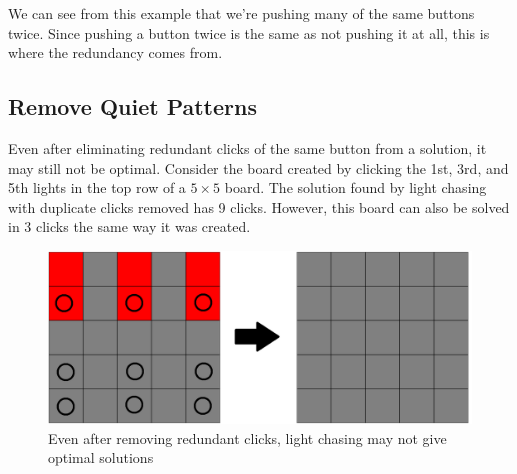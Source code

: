 \documentclass[a4paper]{article}
\begin{document}
	We can see from this example that we're pushing many of the same buttons twice.
	Since pushing a button twice is the same as not pushing it at all, this is where the redundancy comes from.
	
	\subsection{Remove Quiet Patterns}
	Even after eliminating redundant clicks of the same button from a solution, it may still not be optimal.
	Consider the board created by clicking the 1st, 3rd, and 5th lights in the top row of a $5 \times 5$ board.
	The solution found by light chasing with duplicate clicks removed has 9 clicks.
	However, this board can also be solved in 3 clicks the same way it was created.
	
	\begin{figure}[H]
		\centering
		\includegraphics[width=\textwidth]{board6.png}
		\caption{Even after removing redundant clicks, light chasing may not give optimal solutions}
	\end{figure}
\end{document}
